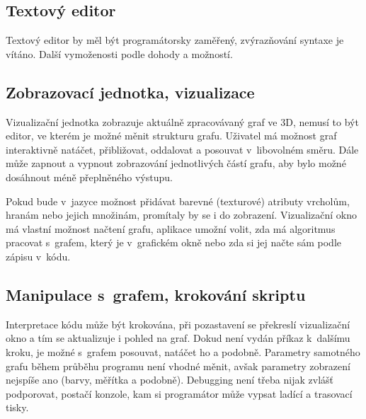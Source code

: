 \documentclass[11pt,twoside,a4paper]{book}
\begin{document}
\subsection{Textový editor}

Textový editor by měl být programátorsky zaměřený, zvýrazňování syntaxe je vítáno. Další vymoženosti podle dohody a možností.


\subsection{Zobrazovací jednotka, vizualizace}

Vizualizační jednotka zobrazuje aktuálně zpracovávaný graf ve 3D, nemusí to být editor, ve kterém je možné měnit strukturu grafu. Uživatel má možnost graf interaktivně natáčet, přibližovat, oddalovat a posouvat v~libovolném směru. Dále může zapnout a vypnout zobrazování jednotlivých částí grafu, aby bylo možné dosáhnout méně přeplněného výstupu.

Pokud bude v~jazyce možnost přidávat barevné (texturové) atributy vrcholům, hranám nebo jejich množinám, promítaly by se i do zobrazení. Vizualizační okno má vlastní možnost načtení grafu, aplikace umožní volit, zda má algoritmus pracovat s~grafem, který je v~grafickém okně nebo zda si jej načte sám podle zápisu v~kódu.


\subsection{Manipulace s~grafem, krokování skriptu}

Interpretace kódu může být krokována, při pozastavení se překreslí vizualizační okno a tím se aktualizuje i pohled na graf. Dokud není vydán příkaz k~dalšímu kroku, je možné s~grafem posouvat, natáčet ho a podobně. Parametry samotného grafu během průběhu programu není vhodné měnit, avšak parametry zobrazení nejspíše ano (barvy, měřítka a podobně). Debugging není třeba nijak zvlášť podporovat, postačí konzole, kam si programátor může vypsat ladící a trasovací tisky.
\end{document}

